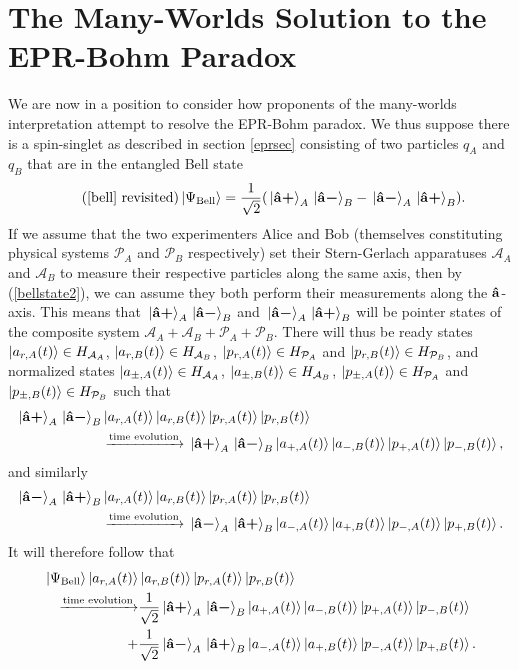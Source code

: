 \section{The Many-Worlds Solution to the EPR-Bohm Paradox}
We are now in a position to consider how proponents of the many-worlds interpretation attempt to resolve the EPR-Bohm paradox. We thus suppose there is a spin-singlet as described in section \ref{eprsec} consisting of two particles $q_A$ and $q_B$ that are in the entangled Bell state 
\begin{equation}\tag{\ref{bell} revisited}
      \ket*{\Psi_{\text{Bell}}}=\frac{1}{\sqrt{2}}(\ket*{\uvbp{a}}_A\ket*{\uvbm{a}}_B-\ket*{\uvbm{a}}_A\ket*{\uvbp{a}}_B).
\end{equation}
If we assume that the two experimenters Alice and Bob (themselves constituting physical systems $\mathcal{P}_A$ and $\mathcal{P}_B$ respectively) set their Stern-Gerlach apparatuses $\mathcal{A}_A$ and $\mathcal{A}_B$ to measure their respective particles along the same axis, then by (\ref{bellstate2}), we can assume they both perform their measurements along the $\vb{\hat{{a}}}$-axis. This means that $\ket*{\vb{\hat{{a}}}\bm{+}}_A\ket*{\vb{\hat{{a}}}\bm{-}}_B$ and $\ket*{\vb{\hat{{a}}}\bm{-}}_A\ket*{\vb{\hat{{a}}}\bm{+}}_B$ will be pointer states of the composite system $\mathcal{A}_A+\mathcal{A}_B+\mathcal{P}_A+\mathcal{P}_B$. There will thus be ready states $\ket{a_{r,A}(t)}\in H_{\mathcal{A}_A}$, $\ket{a_{r,B}(t)}\in H_{\mathcal{A}_B}$, $\ket{p_{r,A}(t)}\in H_{\mathcal{P}_A}$ and $\ket{p_{r,B}(t)}\in H_{\mathcal{P}_B}$, and normalized states  $\ket{a_{\pm,A}(t)}\in H_{\mathcal{A}_A}$, $\ket{a_{\pm,B}(t)}\in H_{\mathcal{A}_B}$, $\ket{p_{\pm,A}(t)}\in H_{\mathcal{P}_A}$ and $\ket{p_{\pm,B}(t)}\in H_{\mathcal{P}_B}$ such that 
\begin{align*}\ket*{\vb{\hat{{a}}}\bm{+}}_A\ket*{\vb{\hat{{a}}}\bm{-}}_B&\ket{a_{r,A}(t)}\ket{a_{r,B}(t)}\ket{p_{r, A}(t)}\ket{p_{r, B}(t)}\\ &\xrightarrow{\text{time evolution}}\ket*{\vb{\hat{{a}}}\bm{+}}_A\ket*{\vb{\hat{{a}}}\bm{-}}_B\ket{a_{+,A}(t)}\ket{a_{-,B}(t)}\ket{p_{+, A}(t)}\ket{p_{-, B}(t)},\end{align*}
and similarly
\begin{align*}\ket*{\vb{\hat{{a}}}\bm{-}}_A\ket*{\vb{\hat{{a}}}\bm{+}}_B&\ket{a_{r,A}(t)}\ket{a_{r,B}(t)}\ket{p_{r, A}(t)}\ket{p_{r, B}(t)}\\ &\xrightarrow{\text{time evolution}}\ket*{\vb{\hat{{a}}}\bm{-}}_A\ket*{\vb{\hat{{a}}}\bm{+}}_B\ket{a_{-,A}(t)}\ket{a_{+,B}(t)}\ket{p_{-, A}(t)}\ket{p_{+, B}(t)}.\end{align*}
It will therefore follow that 
\begin{equation}\label{manyworldsEPR}
  \begin{split}\ket*{\Psi_{\text{Bell}}}\ket{a_{r,A}(t)}&\ket{a_{r,B}(t)}\ket{p_{r, A}(t)}\ket{p_{r, B}(t)}\\ 
    \xrightarrow{\text{time evolution}}&\frac{1}{\sqrt{2}}\ket*{\vb{\hat{{a}}}\bm{+}}_A\ket*{\vb{\hat{{a}}}\bm{-}}_B\ket{a_{+,A}(t)}\ket{a_{-,B}(t)}\ket{p_{+, A}(t)}\ket{p_{-, B}(t)}\\
  +& \frac{1}{\sqrt{2}}\ket*{\vb{\hat{{a}}}\bm{-}}_A\ket*{\vb{\hat{{a}}}\bm{+}}_B\ket{a_{-,A}(t)}\ket{a_{+,B}(t)}\ket{p_{-, A}(t)}\ket{p_{+, B}(t)}.\end{split}
\end{equation}
